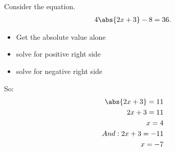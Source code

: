 \documentclass{report}
\begin{document}
    \bigbreak \noindent 
    Consider the equation.
    \begin{align*}
        4\abs{2x+3} - 8 = 36
    .\end{align*}
    \begin{itemize}
        \item Get the absolute value alone
        \item solve for positive right side
        \item solve for negative right side
    \end{itemize}
    \bigbreak \noindent
    So:
    \begin{align*}
      \abs{2x+3} = 11 \\
      2x+3 =11 \\
      x = 4 \\
      And: 2x+3 = -11 \\
      x = -7
    \end{align*}


    \pagebreak \bigbreak \noindent
\end{document}

